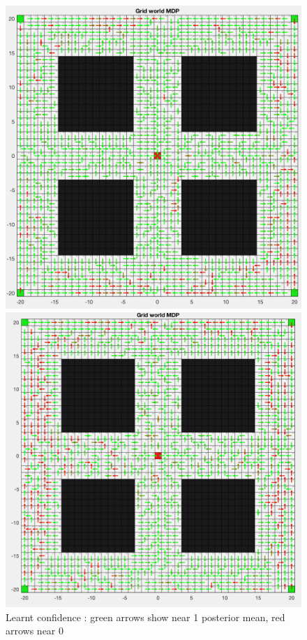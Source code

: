 \documentclass[a4paper]{report}
\begin{document}
{{{{				 \begin{figure}[ht!]
					\begin{minipage}{0.5\linewidth}
						\begin{center}
							\includegraphics[width=0.95\linewidth]{heatmap_confidence_120}
							\caption{Learnt confidence : green arrows show near 1 posterior mean, red arrows near 0}
							\label{fig::heatmap_confidence_120}
						\end{center}
					\end{minipage}
					\begin{minipage}{0.5\linewidth}
						\begin{center}
							\includegraphics[width=0.95\linewidth]{heatmap_confidence_50}

\end{center}
\end{minipage}
\end{figure}}}}}
\end{document}
